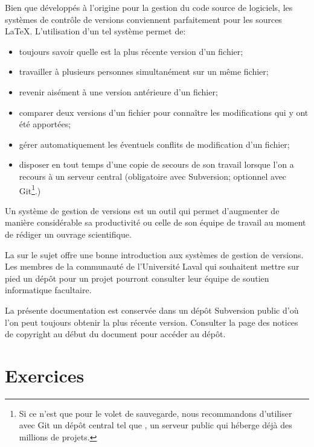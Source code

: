 Bien que développés à l'origine pour la gestion du code source de
logiciels, les systèmes de contrôle de versions conviennent
parfaitement pour les sources {\LaTeX}. L'utilisation d'un tel système
permet de:
\begin{itemize}
\item toujours savoir quelle est la plus récente version d'un fichier;
\item travailler à plusieurs personnes simultanément sur un même
  fichier;
\item revenir aisément à une version antérieure d'un fichier;
\item comparer deux versions d'un fichier pour connaître les
  modifications qui y ont été apportées;
\item gérer automatiquement les éventuels conflits de modification
  d'un fichier;
\item disposer en tout temps d'une copie de secours de son travail
  lorsque l'on a recours à un serveur central (obligatoire avec
  Subversion; optionnel avec Git\footnote{%
    Si ce n'est que pour le volet de sauvegarde, nous recommandons
    d'utiliser avec Git un dépôt central tel que
    , un serveur public qui héberge
    déjà des millions de projets.}.)
\end{itemize}
Un système de gestion de versions est un outil qui permet d'augmenter
de manière considérable sa productivité ou celle de son équipe de
travail au moment de rédiger un ouvrage scientifique.

La %
sur le sujet offre une bonne introduction aux systèmes de gestion de
versions. Les membres de la communauté de l'Université Laval qui
souhaitent mettre sur pied un dépôt pour un projet pourront
consulter leur équipe de soutien informatique facultaire.

\begin{information}
  La présente documentation est conservée dans un dépôt Subversion
  public d'où l'on peut toujours obtenir la plus récente version.
  Consulter la page des notices de copyright au début du document pour
  accéder au dépôt.
\end{information}




\section{Exercices}
\label{sec:trucs:exercices}

